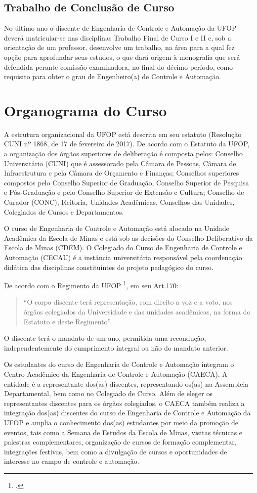 \documentclass[
	12pt,				%
	openright,			%
	oneside,			%
	a4paper,			%
	english,			%
	brazil				%
	]{abntex2}
\begin{document}
\subsection{Trabalho de Conclusão de Curso}
No último ano o discente de Engenharia de Controle e Automação da UFOP deverá matricular-se nas disciplinas Trabalho Final de Curso I e II e, sob a orientação de um professor, desenvolve um trabalho, na área para a qual fez opção para aprofundar seus estudos, o que dará origem à monografia que será defendida perante comissão examinadora, no final do décimo período, como requisito para obter o grau de Engenheiro(a) de Controle e Automação.

\section{Organograma do Curso}
%
A estrutura organizacional da UFOP está descrita em seu estatuto (Resolução CUNI nº 1868, de 17 de fevereiro de 2017). De acordo com o Estatuto da UFOP, a organização dos órgãos superiores de deliberação é composta pelos: Conselho Universitário (CUNI) que é assessorado pela Câmara de Pessoas, Câmara de Infraestrutura e pela Câmara de Orçamento e Finanças; Conselhos superiores compostos pelo Conselho Superior de Graduação, Conselho Superior de Pesquisa e Pós-Graduação e pelo Conselho Superior de Extensão e Cultura; Conselho de Curador (CONC), Reitoria, Unidades Acadêmicas, Conselhos das Unidades, Colegiados de Cursos e Departamentos.

O curso de Engenharia de Controle e Automação está alocado na Unidade Acadêmica da Escola de Minas e está sob as decisões do Conselho Deliberativo da Escola de Minas (CDEM). O Colegiado do Curso de Engenharia de Controle e Automação (CECAU) é a instância universitária responsável pela coordenação didática das disciplinas constituintes do projeto pedagógico do curso.

De acordo com o Regimento da UFOP \footcite{resolucao-cuni-1959}, em seu Art.170:
\begin{quotation}
“O corpo discente terá representação, com direito a voz e a voto, nos órgãos colegiados da Universidade e das unidades acadêmicas, na forma do Estatuto e deste Regimento”.
\end{quotation}

O discente terá o mandato de um ano, permitida uma recondução, independentemente do cumprimento integral ou não do mandato anterior.

Os estudantes do curso de Engenharia de Controle e Automação integram o Centro Acadêmico da Engenharia de Controle e Automação (CAECA). A entidade é a representante dos(as) discentes, representando-os(as) na Assembleia Departamental, bem como no Colegiado de Curso. Além de eleger os representantes discentes para os órgãos colegiados, o CAECA também realiza a integração dos(as) discentes do curso de Engenharia de Controle e Automação da UFOP e amplia o conhecimento dos(as) estudantes por meio da promoção de eventos, tais como a Semana de Estudos da Escola de Minas, visitas técnicas e palestras complementares, organização de cursos de formação complementar, integrações festivas, bem como a divulgação de cursos e oportunidades de interesse no campo de controle e automação.
\end{document}

